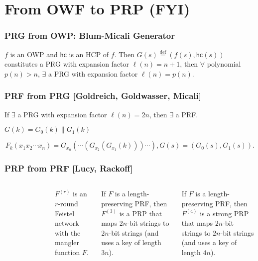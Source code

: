 \section{From OWF to PRP (FYI)}
\begin{frame}\frametitle{PRG from OWP: Blum-Micali Generator}
\begin{theorem}
$f$ is an OWP and $\mathsf{hc}$ is an HCP of $f$. Then $G(s) \overset{\text{def}}{=} (f(s), \mathsf{hc}(s))$ constitutes a PRG with expansion factor $\ell(n) = n+1$, then $\forall$ polynomial $p(n) > n$, $\exists$ a PRG with expansion factor $\ell(n) = p(n)$.
\end{theorem}
\begin{figure}
\begin{center}

\end{center}
\end{figure}
\end{frame}
\begin{frame}\frametitle{PRF from PRG [Goldreich, Goldwasser, Micali]}
\begin{theorem}
If $\exists$ a PRG with expansion factor $\ell(n) = 2n$, then $\exists$ a PRF.
\end{theorem}
$G(k) = G_{0}(k)\| G_{1}(k)$
\begin{figure}
\begin{center}

\end{center}
\end{figure}
\[F_k(x_1x_2\cdots x_n) = G_{x_n}(\cdots(G_{x_2}(G_{x_1}(k)))\cdots), G(s)=(G_0(s),G_1(s)).\]
\end{frame}
\begin{frame}\frametitle{PRP from PRF [Lucy, Rackoff]}
\begin{columns}[c]
\begin{figure}
\begin{center}

\end{center}
\end{figure}
$F^{(r)}$ is an $r$-round Feistel network with the mangler function $F$.
\begin{theorem}
If $F$ is a length-preserving PRF, then $F^{(3)}$ is a PRP that maps $2n$-bit strings to $2n$-bit strings (and uses a key of length $3n$).
\end{theorem}
\begin{theorem}
If $F$ is a length-preserving PRF, then $F^{(4)}$ is a strong PRP that maps $2n$-bit strings to $2n$-bit strings (and uses a key of length $4n$).
\end{theorem}
\end{columns}
\end{frame}
